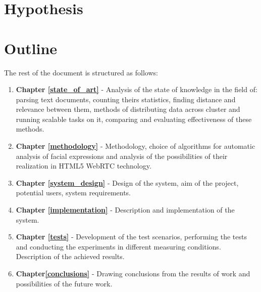 \section{Hypothesis}
\label{hypo}

\section{Outline}
\label{outline}

The rest of the document is structured as follows:
\begin{enumerate}
	\item \textbf{Chapter \ref{state_of_art}} - Analysis of the state of knowledge in the field of: parsing text documents, counting theirs statistics, finding distance and relevance between them, methods of distributing data across cluster and running scalable tasks on it, comparing and evaluating effectiveness of these methods.
	\item \textbf{Chapter \ref{methodology}} - Methodology, choice of algorithms for automatic analysis of facial expressions and analysis of the possibilities of their realization in HTML5 WebRTC technology. 
	\item \textbf{Chapter \ref{system_design}} - Design of the system, aim of the project, potential users, system requirements.
	\item \textbf{Chapter \ref{implementation}} - Description and implementation of the system.
	\item \textbf{Chapter \ref{tests}} - Development of the test scenarios, performing the tests and conducting the experiments in different measuring conditions. Description of the achieved results.
	\item \textbf{Chapter\ref{conclusions}} - Drawing conclusions from the results of work and possibilities of the future work.
\end{enumerate}

